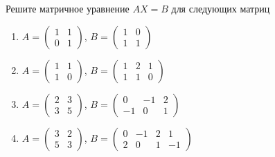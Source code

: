 \begin{exercise}
Решите матричное уравнение \(AX=B\) для следующих матриц
\begin{enumerate}
	\item \(A=\begin{pmatrix}
		1 & 1 \\ 0 & 1
	\end{pmatrix}\), \(B=\begin{pmatrix}
		1 & 0 \\ 1 & 1
	\end{pmatrix}\)
	\item \(A=\begin{pmatrix}
		1 & 1 \\ 1 & 0
	\end{pmatrix}\), \(B=\begin{pmatrix}
		1 & 2 & 1 \\ 1 & 1 & 0
	\end{pmatrix}\)
	\item \(A=\begin{pmatrix}
		2 & 3 \\ 3 & 5
	\end{pmatrix}\), \(B=\begin{pmatrix}
		0 & -1 & 2 \\ -1 & 0 & 1 
	\end{pmatrix}\)
	\item \(A=\begin{pmatrix}
		3 & 2 \\ 5 & 3
	\end{pmatrix}\), \(B=\begin{pmatrix}
		0 & -1 & 2 & 1\\ 2 & 0 & 1 & -1
	\end{pmatrix}\)
\end{enumerate}
\end{exercise}

